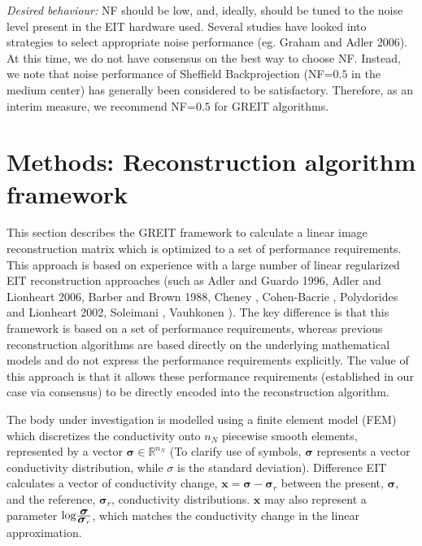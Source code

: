 \documentclass[12pt]{iopart}
\newcommand{\xB}{\mbox{$\mathbf{x}$}}
\newcommand{\sG}{\mbox{${\boldsymbol \sigma}$}}
\begin{document}
\begin{itemize}
\hspace{5mm}
{\em Desired behaviour:}
NF should be low, and, ideally, should be tuned to the noise
level present in the EIT hardware used.
Several studies have looked into strategies to select
appropriate noise performance (eg. Graham and Adler 2006).
At this time, we do not have consensus on the best
way to choose NF. Instead, we note that noise performance
of Sheffield Backprojection (NF=$0.5$ in the medium center)
has generally been considered to be satisfactory.
Therefore, as an interim measure, we recommend NF=$0.5$
for GREIT algorithms.

\end{itemize}

\section{Methods: Reconstruction algorithm framework}

This section describes the GREIT framework to calculate
a linear image reconstruction matrix which is optimized
to a set of performance requirements. This approach
is based on experience with a large number of 
linear regularized EIT reconstruction approaches
(such as
Adler and Guardo 1996,
Adler and Lionheart 2006,
Barber and Brown 1988,
Cheney ,
Cohen-Bacrie ,
Polydorides and Lionheart 2002,
Soleimani ,
Vauhkonen ).
The key difference is that this framework
is based on a set of performance requirements, whereas
previous reconstruction algorithms are based directly on
the underlying mathematical models and do not express
the performance requirements explicitly.
The value of this approach is that it allows
these performance requirements (established in our case
via consensus) to be directly encoded into the
reconstruction algorithm.

The body under investigation is modelled using a finite element
model (FEM) which discretizes the conductivity onto $n_N$
piecewise smooth elements, represented by a vector
$\sG\in\mathbb{R}^{n_N}$ (To clarify use of symbols,
$\sG$ represents a vector conductivity distribution, while
$\sigma$ is the standard deviation).
Difference EIT calculates a vector of
conductivity change, $\xB = \sG - \sG_r$ between the present,
$\sG$, and the reference, $\sG_r$,
conductivity distributions. $\xB$ may also 
represent a parameter ${\rm log} \frac{\sG}{\sG_r}$, which
matches the conductivity change in the linear approximation.
\end{document}
